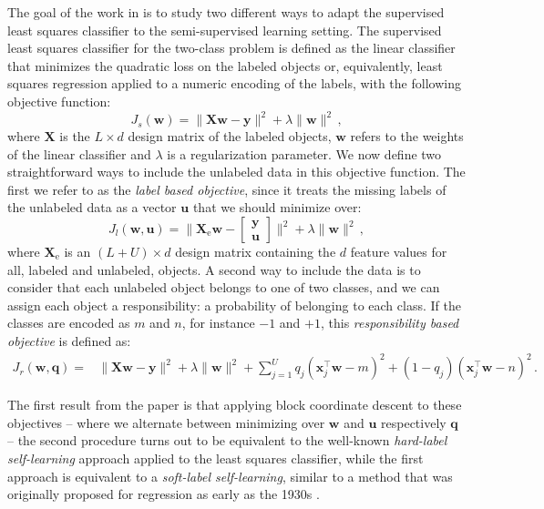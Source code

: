 \documentclass[runningheads,a4paper]{llncs}\usepackage[]{graphicx}\usepackage[]{color}
\newcommand{\Xe}{\mathbf{X}_\textrm{e}}
\begin{document}
The goal of the work in \cite{Krijthe2016a} is to study two different ways to adapt the supervised least squares classifier to the semi-supervised learning setting. The supervised least squares classifier for the two-class problem is defined as the linear classifier that minimizes the quadratic loss on the labeled objects or, equivalently, least squares regression applied to a numeric encoding of the labels, with the following objective function:
\begin{equation}
J_s(\mathbf{w}) = \| \mathbf{X} \mathbf{w}-\mathbf{y} \|^2 + \lambda \|\mathbf{w} \|^2 \,, \nonumber
\end{equation}
where $\mathbf{X}$ is the $L \times d$ design matrix of the labeled objects, $\mathbf{w}$ refers to the weights of the linear classifier and $\lambda$ is a regularization parameter. We now define two straightforward ways to include the unlabeled data in this objective function. The first we refer to as the \emph{label based objective}, since it treats the missing labels of the unlabeled data as a vector $\mathbf{u}$ that we should minimize over:
$$
J_l(\mathbf{w},\mathbf{u}) = \| \Xe \mathbf{w}-\begin{bmatrix} \mathbf{y} \\ \mathbf{u} \end{bmatrix} \|^2 + \lambda \|\mathbf{w} \|^2 \,,
$$
where $\Xe$ is an $(L+U) \times d$ design matrix containing the $d$ feature values for all, labeled and unlabeled, objects.
A second way to include the data is to consider that each unlabeled object belongs to one of two classes, and we can assign each object a responsibility: a probability of belonging to each class. If the classes are encoded as $m$ and $n$, for instance $-1$ and $+1$, this \emph{responsibility based objective} is defined as:
\begin{align}
J_r(\mathbf{w},\mathbf{q}) = & \| \mathbf{X} \mathbf{w}-\mathbf{y} \|^2 + \lambda \|\mathbf{w} \|^2 \nonumber + \sum_{j=1}^{U}  q_j (\mathbf{x}_j^\top \mathbf{w} - m)^2  + (1-q_j) (\mathbf{x}_j^\top \mathbf{w} - n)^2 \,. \nonumber
\end{align}

The first result from the paper is that applying block coordinate descent to these objectives -- where we alternate between minimizing over $\mathbf{w}$ and $\mathbf{u}$ respectively $\mathbf{q}$ -- the second procedure turns out to be equivalent to the well-known \emph{hard-label self-learning} approach applied to the least squares classifier, while the first approach is equivalent to a \emph{soft-label self-learning}, similar to a method that was originally proposed for regression as early as the 1930s \cite{Healy1956}.
\end{document}
